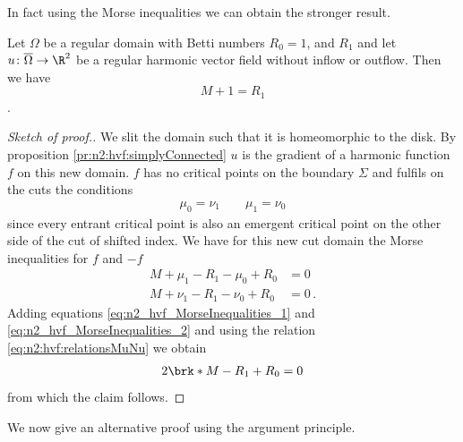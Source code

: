 In fact using the Morse inequalities we can obtain the stronger result.
\begin{proposition}
  Let $\Omega$ be a regular domain with Betti numbers $R_0=1$, and $R_1$ and let $u\colon\overline{\Omega}\to\R^2$ be 
  a regular harmonic vector field without inflow or outflow.
  Then we have $$M+1=R_1$$.
\end{proposition}
\begin{proof}[Sketch of proof.]
  We slit the domain such that it is homeomorphic to the disk. By proposition \ref{pr:n2:hvf:simplyConnected}
  $u$ is the gradient of a harmonic function $f$ on this new domain.
  $f$ has no critical points on the boundary $\Sigma$ and fulfils on the cuts the conditions
  \begin{align}
    \mu_0=\nu_1 \qquad \mu_1=\nu_0 \label{eq:n2:hvf:relationsMuNu}
  \end{align}
  since every entrant critical point is also an emergent critical point on the other side of the cut of shifted index.
  We have for this new cut domain the Morse inequalities for $f$ and $-f$
  \begin{align}
    M+\mu_1-R_1-\mu_0+R_0&=0 \label{eq:n2_hvf_MorseInequalities_1}\\
    M+\nu_1-R_1-\nu_0+R_0&=0\,. \label{eq:n2_hvf_MorseInequalities_2}
  \end{align}
  Adding equations \eqref{eq:n2_hvf_MorseInequalities_1} and \eqref{eq:n2_hvf_MorseInequalities_2} and using the relation
  \eqref{eq:n2:hvf:relationsMuNu} we obtain
  \begin{align*}
    2\brk*{M-R_1+R_0}=0
  \end{align*}
  from which the claim follows.
\end{proof}
We now give an alternative proof using the argument principle.
